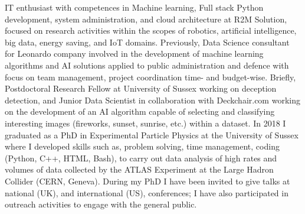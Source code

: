 
IT enthusiast with competences in Machine learning, Full stack Python development, system administration, and cloud architecture at R2M Solution, focused on research activities within the scopes of robotics, artificial intelligence, big data, energy saving, and IoT domains. Previously, Data Science consultant for Leonardo company involved in the development of machine learning algorithms and AI solutions applied to public administration and defence with focus on team management, project coordination time- and budget-wise. 
Briefly, Postdoctoral Research Fellow at University of Sussex working on deception detection, and Junior Data Scientist in collaboration with Deckchair.com working on the development of an AI algorithm capable of selecting and classifying interesting images (fireworks, sunset, sunrise, etc.) within a dataset.
In 2018 I graduated as a PhD in Experimental Particle Physics at the University of Sussex where I developed skills such as, problem solving, time management, coding (Python, C++, HTML, Bash), to carry out data analysis of high rates and volumes of data collected by the ATLAS Experiment at the Large Hadron Collider (CERN, Geneva). During my PhD I have been invited to give talks at national (UK), and international (US), conferences; I have also participated in outreach activities to engage with the general public.